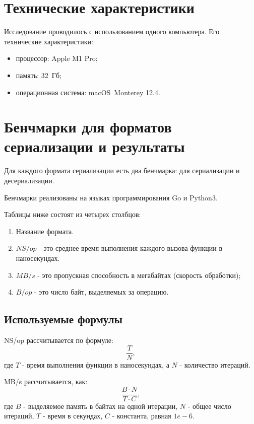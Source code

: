 \clearpage

\section{Технические характеристики}
Исследование проводилось с использованием одного компьютера.
Его технические характеристики:
\begin{itemize}
	\item процессор: Apple M1 Pro;
	\item память: 32~Гб;
	\item операционная система: macOS~Monterey \cite{monterey} 12.4.
\end{itemize}

\section{Бенчмарки для форматов сериализации и результаты}

Для каждого формата сериализации есть два бенчмарка: для сериализации и десериализации.

Бенчмарки реализованы на языках программирования Go и Python3.  

Таблицы ниже состоят из четырех столбцов:
\begin{enumerate}
\item Название формата.
\item $NS/op$ - это среднее время выполнения каждого вызова функции в наносекундах.
\item $MB/s$ - это пропускная способность в мегабайтах (скорость обработки);
\item $B/op$ - это число байт, выделяемых за операцию.
\end{enumerate}
\clearpage

\subsection{Используемые формулы}
NS/op рассчитывается по формуле:
\begin{equation}
\frac{T}{N},
\end{equation}
где $T$ - время выполнения функции в наносекундах, а $N$ - количество итераций.


MB/s рассчитывается, как:
\begin{equation}
\frac{B \cdot N}{T \cdot C},
\end{equation}
где $B$ - выделяемое память в байтах на одной итерации, $N$ - общее число итераций, $T$ - время в секундах, $C$ - константа, равная $1e-6$.

